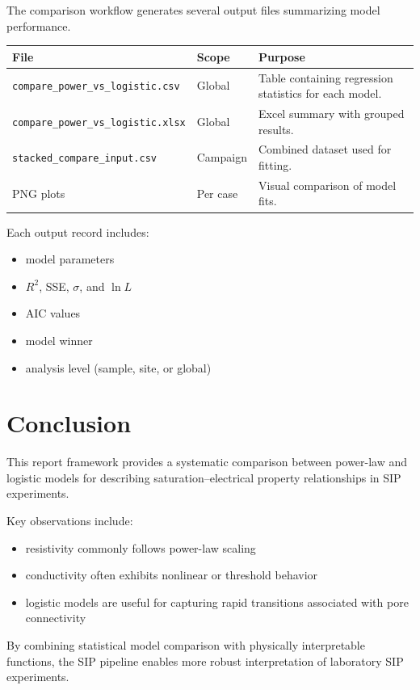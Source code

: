 \documentclass[11pt]{article}
\begin{document}
The comparison workflow generates several output files summarizing model performance.

\begin{longtable}{p{} p{} p{}}
\toprule
\textbf{File} & \textbf{Scope} & \textbf{Purpose}\\
\midrule
\endhead
\texttt{compare\_power\_vs\_logistic.csv} & Global & Table containing regression statistics for each model.\\
\texttt{compare\_power\_vs\_logistic.xlsx} & Global & Excel summary with grouped results.\\
\texttt{stacked\_compare\_input.csv} & Campaign & Combined dataset used for fitting.\\
PNG plots & Per case & Visual comparison of model fits.\\
\bottomrule
\end{longtable}

Each output record includes:

\begin{itemize}

\item model parameters

\item $R^2$, SSE, $\sigma$, and $\ln L$

\item AIC values

\item model winner

\item analysis level (sample, site, or global)

\end{itemize}

\section{Conclusion}

This report framework provides a systematic comparison between power-law and logistic models for describing saturation–electrical property relationships in SIP experiments.

Key observations include:

\begin{itemize}

\item resistivity commonly follows power-law scaling

\item conductivity often exhibits nonlinear or threshold behavior

\item logistic models are useful for capturing rapid transitions associated with pore connectivity

\end{itemize}

By combining statistical model comparison with physically interpretable functions, the SIP pipeline enables more robust interpretation of laboratory SIP experiments.
\end{document}
